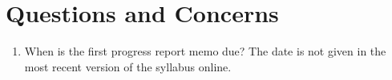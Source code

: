 \documentclass[12pt]{article}
\begin{document}
\section{Questions and Concerns}
\begin{enumerate}
\item When is the first progress report memo due?  The date is not given
in the most recent version of the syllabus online.
\end{enumerate}
\nocite{*}


\label{refs}
\end{document}
